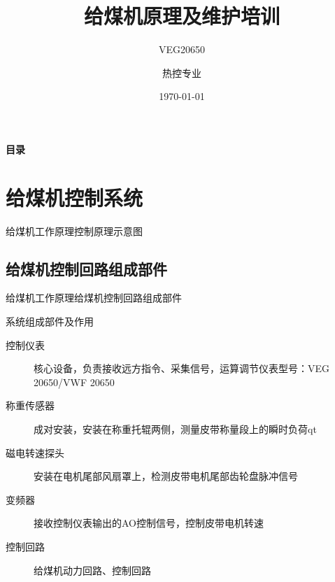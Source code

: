 \documentclass[12pt,hyperref={CJKbookmarks=true}]{beamer} %
\begin{document}
	
	\kaishu
	
	\title{给煤机原理及维护培训}
\subtitle{VEG20650}
	\author{热控专业}
	\date{\today}
	\begin{frame}
		\titlepage
	\end{frame}
\begin{frame}{\textbf{目录}}
\begin{multicols}{2}
\tableofcontents
\end{multicols}
\end{frame}
	\section{给煤机控制系统}
	
\begin{frame}{给煤机工作原理}{控制原理示意图}
	\end{frame}
\subsection{给煤机控制回路组成部件}
\begin{frame}{给煤机工作原理}{给煤机控制回路组成部件}
\begin{block}{系统组成部件及作用}
\begin{description}
				\item[控制仪表]核心设备，负责接收远方指令、采集信号，运算调节仪表型号：VEG 20650/VWF 20650
				\item[称重传感器]成对安装，安装在称重托辊两侧，测量皮带称量段上的瞬时负荷qt
				\item[磁电转速探头]安装在电机尾部风扇罩上，检测皮带电机尾部齿轮盘脉冲信号
				\item[变频器]接收控制仪表输出的AO控制信号，控制皮带电机转速
				\item[控制回路]给煤机动力回路、控制回路
				
			\end{description}
		\end{block}

	\end{frame}
\end{document}
